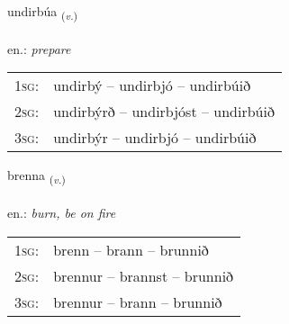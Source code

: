 \documentclass[frontgrid, backgrid]{flacards}\usepackage[]{graphicx}\usepackage[]{xcolor}
\begin{document}
\renewcommand{\blhead}{\vskip5pt {\small\bfseries\footnotesize Sagnorð | Verb }}
\renewcommand{\bcfoot}{\vskip5pt \hspace{2pt}{\small\bfseries\footnotesize 2K}}


{undirbúa \small{\textsubscript{(\textit{v.})}} \\[1ex] %
 \\
en.: \emph{prepare} \\  [2ex]
\renewcommand*{\arraystretch}{0.8}
\begin{tabular}{p{1cm}l}
\textsc{1sg}: & undirbý -- undirbjó -- undirbúið \\ 
\textsc{2sg}: & undirbýrð -- undirbjóst -- undirbúið \\ 
\textsc{3sg}: & undirbýr -- undirbjó -- undirbúið \\ 
\end{tabular}
}

\renewcommand{\flhead}{\vskip5pt \fboxsep=0pt {\small\bfseries\footnotesize Sagnorð | Verb}}
\renewcommand{\fcfoot}{\vskip5pt \fboxsep=0pt \hspace{2pt}{\small\bfseries\footnotesize 2K}}

\renewcommand{\blhead}{\vskip5pt {\small\bfseries\footnotesize Sagnorð | Verb }}
\renewcommand{\bcfoot}{\vskip5pt \hspace{2pt}{\small\bfseries\footnotesize 2K}}


{brenna \small{\textsubscript{(\textit{v.})}} \\[1ex] %
\textphonetic{[prɛna]} \\
en.: \emph{burn, be on fire} \\  [2ex]
\renewcommand*{\arraystretch}{0.8}
\begin{tabular}{p{1cm}l}
\textsc{1sg}: & brenn -- brann -- brunnið \\ 
\textsc{2sg}: & brennur -- brannst -- brunnið \\ 
\textsc{3sg}: & brennur -- brann -- brunnið \\ 
\end{tabular}
}
\end{document}
